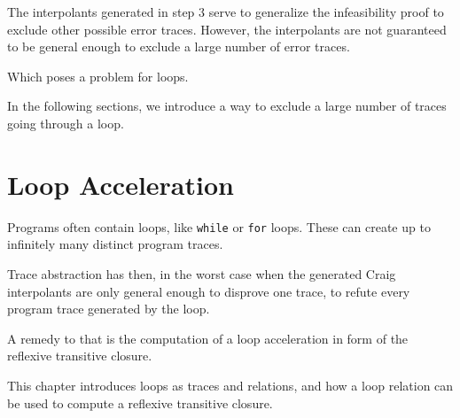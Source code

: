 \documentclass{article}
\newcommand\mycom[1]{}
\newcommand\mycom[1]{#1}
\newcommand{\dd}[1]{\mycom{\todo[color=orange!40,inline]{\small DD: #1}}}
\newcommand{\ts}[1]{\mycom{\todo[color=green!40,inline]{\small TS: #1}}}
\begin{document}
\ts{How are the interpolant automata used in Step 1? As described so far, one could just take the same trace over and over again.}
The interpolants generated in step 3 serve to generalize the infeasibility proof to exclude other possible error traces. 
However, the interpolants are not guaranteed to be general enough to exclude a large number of error traces.
\ts{But what is guaranteed?} 
Which poses a problem for loops. 
\dd{Use complete sentences}
In the following sections, we introduce a way to exclude a large number of traces going through a loop.


\section{Loop Acceleration}\label{sec:loopaccel}
Programs often contain loops, like \texttt{while} or \texttt{for} loops. 
These can create up to infinitely many distinct program traces. 
\dd{``Up to infinity'' seems like a strange bound ;)}
Trace abstraction has then, in the worst case when the generated Craig interpolants are only general enough to disprove one trace, to refute every program trace generated by the loop.
\dd{i.e., infinitely many.}
A remedy to that is the computation of a loop acceleration in form of the reflexive transitive closure. 
\dd{Why?}
This chapter introduces loops as traces and relations, and how a loop relation can be used to compute a reflexive transitive closure.
\ts{Explain why you don't just take the original loops, what is the difference?}
\end{document}
